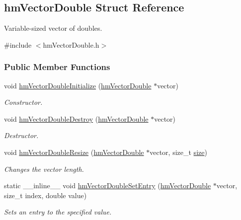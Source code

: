 \hypertarget{structhm_vector_double}{\subsection{hm\-Vector\-Double Struct Reference}
\label{structhm_vector_double}
}


Variable-\/sized vector of doubles.  




{\ttfamily \#include $<$hm\-Vector\-Double.\-h$>$}

\subsubsection*{Public Member Functions}
\begin{DoxyCompactItemize}
\item 
void \hyperlink{structhm_vector_double_ad441fba5e8cb6071a4bd5bc27be495b4}{hm\-Vector\-Double\-Initialize} (\hyperlink{structhm_vector_double}{hm\-Vector\-Double} $\ast$vector)
\begin{DoxyCompactList}\small\item\em Constructor. \end{DoxyCompactList}\item 
void \hyperlink{structhm_vector_double_a3a5d74be659a45e18e4ec45e96eab799}{hm\-Vector\-Double\-Destroy} (\hyperlink{structhm_vector_double}{hm\-Vector\-Double} $\ast$vector)
\begin{DoxyCompactList}\small\item\em Destructor. \end{DoxyCompactList}\item 
void \hyperlink{structhm_vector_double_a7a7a0b3073ace1b027fc89ada05946c6}{hm\-Vector\-Double\-Resize} (\hyperlink{structhm_vector_double}{hm\-Vector\-Double} $\ast$vector, size\-\_\-t \hyperlink{structhm_vector_double_a854352f53b148adc24983a58a1866d66}{size})
\begin{DoxyCompactList}\small\item\em Changes the vector length. \end{DoxyCompactList}\item 
static \-\_\-\-\_\-inline\-\_\-\-\_\- void \hyperlink{structhm_vector_double_a85117f4871596c46ad49fed00edd9a26}{hm\-Vector\-Double\-Set\-Entry} (\hyperlink{structhm_vector_double}{hm\-Vector\-Double} $\ast$vector, size\-\_\-t index, double value)
\begin{DoxyCompactList}\small\item\em Sets an entry to the specified value. \end{DoxyCompactList}\item 

\end{DoxyCompactItemize}
